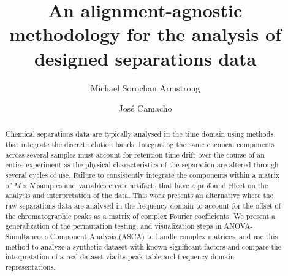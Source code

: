\documentclass[preprint,12pt]{elsarticle}
\begin{document}
\begin{frontmatter}



\title{An alignment-agnostic methodology for the analysis of designed separations data}


\author{Michael Sorochan Armstrong}
\author{Jos\'e Camacho}
\address{Computational Data Science (CoDaS) Lab, Department of Signal Theory, Networks and Communication - University of Granada,%
            C/ Periodista Daniel Saucedo Aranda, 
            Granada,
            18071, 
            Andalusia,
            Spain}
\begin{abstract}
Chemical separations data are typically analysed in the time domain using methods that integrate the discrete elution bands. Integrating the same chemical components across several samples must account for retention time drift over the course of an entire experiment as the physical characteristics of the separation are altered through several cycles of use. Failure to consistently integrate the components within a matrix of $M \times N$ samples and variables create artifacts that have a profound effect on the analysis and interpretation of the data. This work presents an alternative where the raw separations data are analysed in the frequency domain to account for the offset of the chromatographic peaks as a matrix of complex Fourier coefficients. We present a generalization of the permutation testing, and visualization steps in ANOVA-Simultaneous Component Analysis (ASCA) to handle complex matrices, and use this method to analyze a synthetic dataset with known significant factors and compare the interpretation of a real dataset via its peak table and frequency domain representations.


\end{abstract}
\end{frontmatter}
\end{document}
